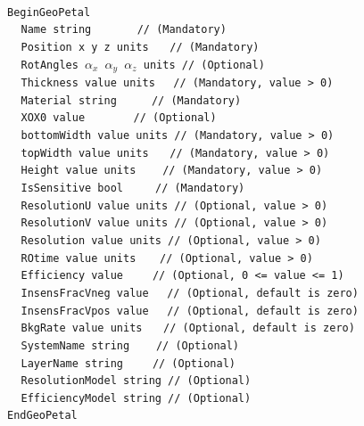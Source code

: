~\\
\noindent
{\tt BeginGeoPetal} \\
$~~~~~${\tt Name             string                   $~~~~~~~~~~~~$   // (Mandatory)} \\
$~~~~~${\tt Position         x  y  z units                     $~~~$   // (Mandatory)} \\
$~~~~~${\tt RotAngles        $\alpha_x$  $\alpha_y$  $\alpha_z$ units  // (Optional)}  \\
$~~~~~${\tt Thickness        value  units                       $~~$   // (Mandatory, value > 0)} \\
$~~~~~${\tt Material         string                       $~~~~~~~~$   // (Mandatory)} \\
$~~~~~${\tt XOX0             value                   $~~~~~~~~~~~~~$   // (Optional)}  \\
$~~~~~${\tt bottomWidth      value units                               // (Mandatory, value > 0)} \\
$~~~~~${\tt topWidth         value units                       $~~~$   // (Mandatory, value > 0)} \\
$~~~~~${\tt Height           value units                     $~~~~~$   // (Mandatory, value > 0)} \\
$~~~~~${\tt IsSensitive      bool                          $~~~~~~~$   // (Mandatory)} \\
$~~~~~${\tt ResolutionU      value units                               // (Optional, value > 0)} \\
$~~~~~${\tt ResolutionV      value units                               // (Optional, value > 0)} \\
$~~~~~${\tt Resolution       value units                               // (Optional, value > 0)} \\
$~~~~~${\tt ROtime           value units                      $~~~~$   // (Optional, value > 0)} \\
$~~~~~${\tt Efficiency       value                          $~~~~~~$   // (Optional, 0 <= value <= 1)} \\
$~~~~~${\tt InsensFracVneg   value                              $~~$   // (Optional, default is zero)} \\
$~~~~~${\tt InsensFracVpos   value                              $~~$   // (Optional, default is zero)} \\
$~~~~~${\tt BkgRate          value units                       $~~~$   // (Optional, default is zero)} \\
$~~~~~${\tt SystemName       string                          $~~~~~$   // (Optional)} \\
$~~~~~${\tt LayerName        string                         $~~~~~~$   // (Optional)} \\
$~~~~~${\tt ResolutionModel  string                                    // (Optional)} \\
$~~~~~${\tt EfficiencyModel  string                                    // (Optional)} \\
{\tt EndGeoPetal}

